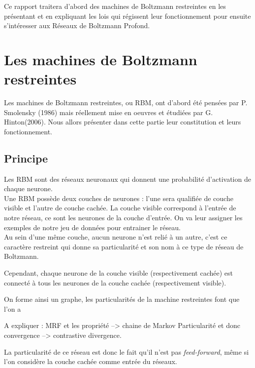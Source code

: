 \documentclass[a4paper,twoside]{report}
\begin{document}
            Ce rapport traitera d'abord des machines de Boltzmann restreintes en les
            présentant et en expliquant les lois qui régissent leur fonctionnement pour
            ensuite s'intéresser aux Réseaux de Boltzmann Profond.

        \chapter{Les machines de Boltzmann restreintes}

            Les machines de Boltzmann restreintes, ou RBM, ont d'abord été
            pensées par P. Smolensky (1986) mais réellement mise en oeuvres et
            étudiées par G.
            Hinton(2006). Nous allors présenter dans cette partie leur constitution et
            leurs fonctionnement.

            \section{Principe}

                Les RBM sont des réseaux neuronaux qui donnent une
                probabilité d'activation de chaque neurone.\\

                Une RBM possède deux couches de neurones : l'une sera qualifiée de couche visible et l'autre de couche cachée.
                La couche visible correspond à l'entrée de notre réseau, ce sont les neurones de la couche d'entrée. On va leur assigner les exemples de notre jeu de données pour entrainer le réseau.\\

                Au sein d'une même couche, aucun neurone n'est relié à un
                autre, c'est ce caractère restreint qui donne sa particularité et son nom à ce type de réseau de Boltzmann.

                Cependant, chaque neurone de la couche visible (respectivement cachée) est connecté à tous les neurones de la couche cachée
                (respectivement visible).

                On forme ainsi un graphe, les particularités de la machine restreintes font que
                l'on a 

                A expliquer : MRF et les propriété --> chaine de Markov
                Particularité et donc convergence --> contrastive divergence.

                La particularité de ce réseau est donc le fait qu'il n'est pas
                \textit{feed-forward}, même si l'on considère la couche cachée comme entrée du
                réseaux.
\end{document}
